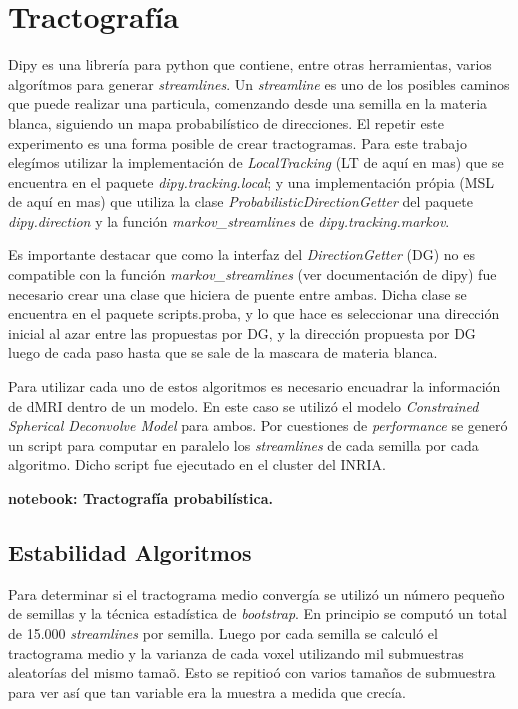 \section{Tractograf\'ia}

Dipy es una librer\'ia para python que contiene, entre otras herramientas,
varios algor\'itmos para generar \textit{streamlines}. Un \textit{streamline} es
uno de los posibles caminos que puede realizar una particula, comenzando desde una
semilla en la materia blanca, siguiendo un mapa probabil\'istico de direcciones.
El repetir este experimento es una forma posible de crear tractogramas. Para este
trabajo eleg\'imos utilizar la implementaci\'on de \textit{LocalTracking} (LT de
aqu\'i en mas) que se encuentra en el paquete \textit{dipy.tracking.local}; y 
una implementaci\'on  pr\'opia (MSL de aqu\'i en mas) que utiliza la clase \textit{ProbabilisticDirectionGetter} del paquete \textit{dipy.direction} y la funci\'on
\textit{markov\_streamlines} de \textit{dipy.tracking.markov}.

Es importante destacar que como la interfaz del \textit{DirectionGetter} (DG) 
no es compatible con la funci\'on \textit{markov\_streamlines} (ver documentaci\'on
de dipy) fue necesario crear una clase que hiciera de puente entre ambas. Dicha 
clase se encuentra en el paquete scripts.proba, y lo que hace es seleccionar 
una direcci\'on inicial al azar entre las propuestas por DG, y la direcci\'on
propuesta por DG luego de cada paso hasta que se sale de la mascara de materia
blanca. 

Para utilizar cada uno de estos algoritmos es necesario encuadrar la informaci\'on
de dMRI dentro de un modelo. En este caso se utiliz\'o el modelo 
\textit{ Constrained Spherical Deconvolve Model} para ambos.  
Por cuestiones de \textit{performance} se gener\'o un script para computar en
paralelo los \textit{streamlines} de cada semilla por cada algoritmo. Dicho script 
fue ejecutado en el cluster del INRIA.

\textbf{notebook: Tractograf\'ia probabil\'istica.}

\subsection{Estabilidad Algoritmos}

Para determinar si el tractograma medio converg\'ia se utiliz\'o un n\'umero 
peque\~no de semillas y la t\'ecnica  estad\'istica de \textit{bootstrap}.
En principio se comput\'o un total de 15.000 \textit{streamlines} por semilla.
Luego por cada semilla se calcul\'o el tractograma medio y la varianza de 
cada voxel utilizando mil submuestras aleator\'ias del mismo tama\~o. Esto se
repitio\'o con varios tama\~nos de submuestra para ver as\'i que tan variable
era la muestra a medida que crec\'ia.

